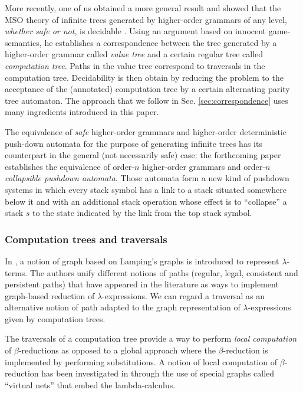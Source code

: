 \documentclass{llncs}
\begin{document}
More recently, one of us obtained a more general result and showed that the MSO theory of infinite trees generated by higher-order grammars of any level, \emph{whether safe or not}, is decidable \cite{OngLics2006}.
Using an argument based on innocent game-semantics, he establishes a correspondence between the tree generated by a higher-order grammar called \emph{value tree} and a certain regular tree called  \emph{computation tree}. Paths in the value tree correspond to traversals in the computation tree.
Decidability is then obtain by reducing the problem to the acceptance of the (annotated) computation tree by a certain alternating parity tree automaton.
The approach that we follow in Sec. \ref{sec:correspondence} uses many ingredients introduced in this paper.


The equivalence of \emph{safe} higher-order grammars and
higher-order deterministic push-down automata
for the purpose of generating infinite trees \cite{KNU02}
has its counterpart in the general (not necessarily safe) case:
the forthcoming paper \cite{hague-sto07} establishes the equivalence of order-$n$ higher-order grammars and order-$n$ \emph{collapsible pushdown automata}. Those automata form a new kind of pushdown systems in which every stack symbol has a link to a stack situated somewhere below it and with an additional stack operation whose effect is to ``collapse'' a stack $s$ to the state indicated by the link from the top stack symbol.

\subsubsection{Computation trees and traversals}

In \cite{DBLP:conf/lics/AspertiDLR94}, a notion of graph based on
Lamping's graphs \cite{lamping} is introduced to represent
$\lambda$-terms. The authors unify different notions of paths
(regular, legal, consistent and persistent paths) that have appeared
in the literature as ways to implement graph-based reduction of
$\lambda$-expressions. We can regard a traversal as an alternative
notion of path adapted to the graph representation of
$\lambda$-expressions given by computation trees.

The traversals of a computation tree provide a way
to perform \emph{local computation} of $\beta$-reductions as opposed
to a global approach where the $\beta$-reduction is implemented by
performing substitutions. A notion of local computation of
$\beta$-reduction has been investigated in
\cite{DanosRegnier-Localandasynchronou} through the use of special
graphs called ``virtual nets'' that embed the lambda-calculus.
\end{document}
